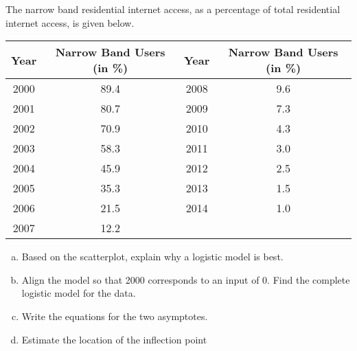 \documentclass[notes]{subfiles}
\begin{document}
		\begin{ex}
			The narrow band residential internet access, as a percentage of total residential internet access, is given below.
			\begin{center}
				{\renewcommand{\arraystretch}{1.2}
				\begin{tabular}{|c|c||c|c|} \hline
					\textbf{Year} & \textbf{Narrow Band Users} (in \%) & \textbf{Year} & \textbf{Narrow Band Users} (in \%) \\ \hline
					2000 & 89.4 & 2008 & 9.6 \\ \hline
					2001 & 80.7 & 2009 & 7.3 \\ \hline
					2002 & 70.9 & 2010 & 4.3 \\ \hline
					2003 & 58.3 & 2011 & 3.0 \\ \hline
					2004 & 45.9 & 2012 & 2.5 \\ \hline
					2005 & 35.3 & 2013 & 1.5 \\ \hline
					2006 & 21.5 & 2014 & 1.0 \\ \hline
					2007 & 12.2 & & \\ \hline
				\end{tabular}
				}
			\end{center}
			\begin{enumerate}[(a)]
				\item Based on the scatterplot, explain why a logistic model is best.
				\item Align the model so that 2000 corresponds to an input of 0.  Find the complete logistic model for the data.
				\item Write the equations for the two asymptotes.
				\item Estimate the location of the inflection point
			\end{enumerate}
		\end{ex}
	\clearpage
\end{document}
